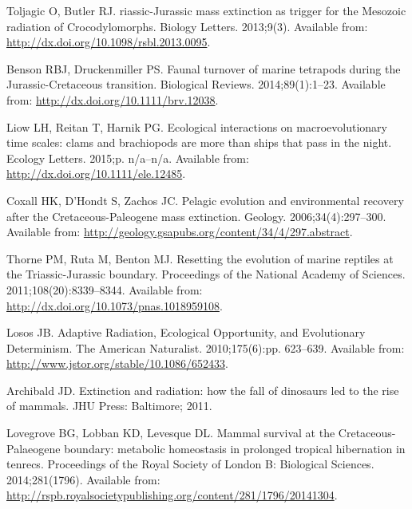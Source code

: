 \documentclass[12pt,letterpaper]{article}
\begin{document}
\begin{thebibliography}{10}
Toljagic O, Butler RJ.
riassic-{J}urassic mass extinction as trigger for the {M}esozoic
  radiation of {C}rocodylomorphs.
\newblock Biology Letters. 2013;9(3).
\newblock Available from: \url{http://dx.doi.org/10.1098/rsbl.2013.0095}.

Benson RBJ, Druckenmiller PS.
\newblock Faunal turnover of marine tetrapods during the
  {J}urassic-{C}retaceous transition.
\newblock Biological Reviews. 2014;89(1):1--23.
\newblock Available from: \url{http://dx.doi.org/10.1111/brv.12038}.

Liow LH, Reitan T, Harnik PG.
\newblock Ecological interactions on macroevolutionary time scales: clams and
  brachiopods are more than ships that pass in the night.
\newblock Ecology Letters. 2015;p. n/a--n/a.
\newblock Available from: \url{http://dx.doi.org/10.1111/ele.12485}.

Coxall HK, D'Hondt S, Zachos JC.
\newblock Pelagic evolution and environmental recovery after the
  {C}retaceous-{P}aleogene mass extinction.
\newblock Geology. 2006;34(4):297--300.
\newblock Available from:
  \url{http://geology.gsapubs.org/content/34/4/297.abstract}.

Thorne PM, Ruta M, Benton MJ.
\newblock Resetting the evolution of marine reptiles at the
  {T}riassic-{J}urassic boundary.
\newblock Proceedings of the National Academy of Sciences.
  2011;108(20):8339--8344.
\newblock Available from: \url{http://dx.doi.org/10.1073/pnas.1018959108}.

Losos JB.
\newblock Adaptive Radiation, Ecological Opportunity, and Evolutionary
  Determinism.
\newblock The {A}merican Naturalist. 2010;175(6):pp. 623--639.
\newblock Available from: \url{http://www.jstor.org/stable/10.1086/652433}.

Archibald JD.
\newblock Extinction and radiation: how the fall of dinosaurs led to the rise
  of mammals.
\newblock JHU Press: Baltimore; 2011.

Lovegrove BG, Lobban KD, Levesque DL.
\newblock Mammal survival at the {C}retaceous-{P}alaeogene boundary: metabolic
  homeostasis in prolonged tropical hibernation in tenrecs.
\newblock Proceedings of the Royal Society of London B: Biological Sciences.
  2014;281(1796).
\newblock Available from:
  \url{http://rspb.royalsocietypublishing.org/content/281/1796/20141304}.


\end{thebibliography}
\end{document}
